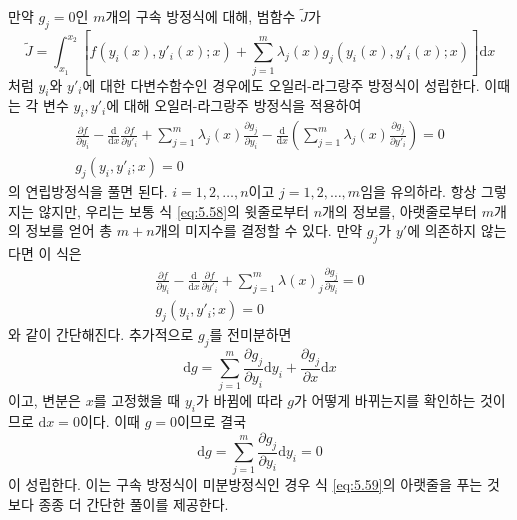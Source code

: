 \documentclass[chapter, oneside, b5paper]{oblivoir}
\theoremstyle{plain}
\theoremstyle{definition}
\theoremstyle{remark}
\begin{document}
만약 $g_j=0$인 $m$개의 구속 방정식에 대해, 범함수 $\tilde{J}$가
\begin{equation}
    \tilde{J} = \int_{x_1}^{x_2} \left[f(y_i (x), y'_i(x) ; x) + \sum_{j=1}^{m}\lambda_j(x)g_j(y_i (x), y'_i(x) ; x) \right] \mathrm{d}x
    \label{eq:5.57}
\end{equation}
처럼 $y_i$와 $y'_i$에 대한 다변수함수인 경우에도 오일러-라그랑주 방정식이 성립한다. 이때는 각 변수 $y_i, y'_i$에 대해 오일러-라그랑주 방정식을 적용하여
\begin{equation}
\begin{aligned}
    \frac{\partial f}{\partial y_i} - \frac{\mathrm{d}}{\mathrm{d}x}\frac{\partial f}{\partial y'_i} + \sum_{j=1}^{m}\lambda_j(x)\frac{\partial g_j}{\partial y_i} - \frac{\mathrm{d}}{\mathrm{d}x} \left(\sum_{j=1}^{m}\lambda_j(x)\frac{\partial g_j}{\partial y'_i} \right) = 0 \\
    g_j(y_i, y'_i ; x) = 0
\end{aligned}
\label{eq:5.58}
\end{equation}
의 연립방정식을 풀면 된다. $i=1, 2, \dots, n$이고 $j=1, 2, \dots, m$임을 유의하라. 항상 그렇지는 않지만, 우리는 보통 식 \ref{eq:5.58}의 윗줄로부터 $n$개의 정보를, 아랫줄로부터 $m$개의 정보를 얻어 총 $m+n$개의 미지수를 결정할 수 있다. 만약 $g_j$가 $y'$에 의존하지 않는다면 이 식은
\begin{equation}
\begin{aligned}
    \frac{\partial f}{\partial y_i} - \frac{\mathrm{d}}{\mathrm{d}x}\frac{\partial f}{\partial y'_i} + \sum_{j=1}^{m}\lambda(x)_j\frac{\partial g_j}{\partial y_i} = 0 \\
    g_j(y_i, y'_i ; x) = 0
\end{aligned}
\label{eq:5.59}
\end{equation}
와 같이 간단해진다. 추가적으로 $g_j$를 전미분하면
\begin{equation}
    \mathrm{d}g = \sum_{j=1}^{m} \frac{\partial g_j}{\partial y_i} \mathrm{d}y_i + \frac{\partial g_j}{\partial x} \mathrm{d}x
\end{equation}
이고, 변분은 $x$를 고정했을 때 $y_i$가 바뀜에 따라 $g$가 어떻게 바뀌는지를 확인하는 것이므로 $\mathrm{d}x = 0$이다. 이때 $g=0$이므로 결국
\begin{equation}
    \mathrm{d}g = \sum_{j=1}^{m} \frac{\partial g_j}{\partial y_i} \mathrm{d}y_i = 0
\end{equation}
이 성립한다. 이는 구속 방정식이 미분방정식인 경우 식 \ref{eq:5.59}의 아랫줄을 푸는 것보다 종종 더 간단한 풀이를 제공한다.
\end{document}
